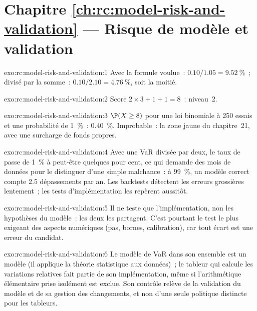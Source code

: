 \section*{Chapitre \ref{ch:rc:model-risk-and-validation} --- Risque de modèle et validation}

\begin{solution}{exo:rc:model-risk-and-validation:1}
Avec la formule voulue~: $0.10/1.05 = 9.52~\%$~; divisé par la somme~: $0.10/2.10 = 4.76~\%$, soit la moitié.
\end{solution}

\begin{solution}{exo:rc:model-risk-and-validation:2}
Score $2\times3+1+1 = 8$~: niveau~2.
\end{solution}

\begin{solution}{exo:rc:model-risk-and-validation:3}
$\P(X\ge8)$ pour une loi binomiale à 250 essais et une probabilité de 1~\%~: 0.40~\%. Improbable~: la zone jaune du
chapitre~21, avec une surcharge de fonds propres.
\end{solution}

\begin{solution}{exo:rc:model-risk-and-validation:4}
Avec une VaR divisée par deux, le taux de  passe de 1~\% à peut-être quelques pour cent, ce qui demande des mois de données
pour le distinguer d'une simple malchance~: à 99~\%, un modèle correct compte 2.5 dépassements par an. Les backtests détectent les
erreurs grossières lentement~; les tests d'implémentation les repèrent aussitôt.
\end{solution}

\begin{solution}{exo:rc:model-risk-and-validation:5}
Il ne teste que l'implémentation, non les hypothèses du modèle~: les deux les partagent. C'est pourtant le
test le plus exigeant des aspects numériques (pas, bornes, calibration), car tout écart est une erreur du
candidat.
\end{solution}

\begin{solution}{exo:rc:model-risk-and-validation:6}
Le modèle de VaR dans son ensemble est un modèle (il applique la théorie statistique aux données)~; le tableur qui calcule
les variations relatives fait partie de son implémentation, même si l'arithmétique élémentaire prise isolément est exclue. Son
contrôle relève de la validation du modèle et de sa gestion des changements, et non d'une seule
politique distincte pour les tableurs.
\end{solution}

